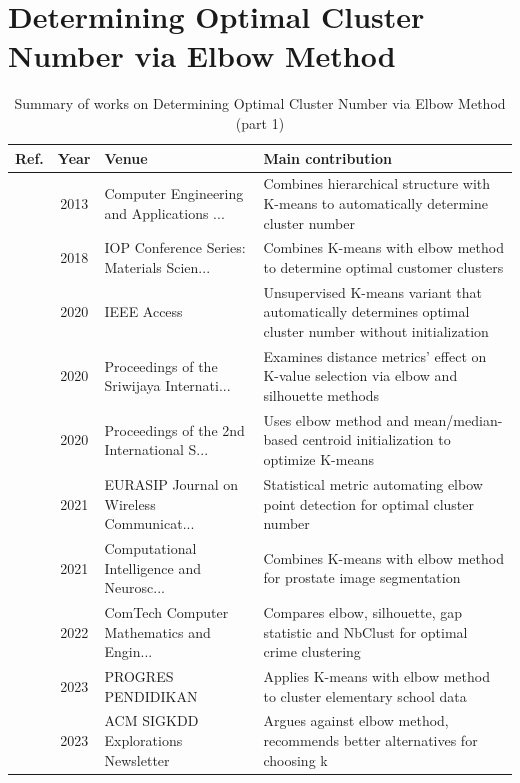 \section{Determining Optimal Cluster Number via Elbow Method}\label{sec:theme1}
\begin{table}[!t]
\centering
\renewcommand{\arraystretch}{1.2}
\caption{Summary of works on Determining Optimal Cluster Number via Elbow Method (part 1)}\label{tab:theme1}
\begin{tabularx}{\textwidth}{@{}l c p{3.6cm} X@{}}
\toprule
\textbf{Ref.} & \textbf{Year} & \textbf{Venue} & \textbf{Main contribution} \\
\midrule
\cite{wei2013improved} & 2013 & Computer Engineering and Applications ... & Combines hierarchical structure with K-means to automatically determine cluster number \\
\cite{syakur2018integration} & 2018 & IOP Conference Series: Materials Scien... & Combines K-means with elbow method to determine optimal customer clusters \\
\cite{sinaga2020unsupervised} & 2020 & IEEE Access & Unsupervised K-means variant that automatically determines optimal cluster number without initialization \\
\cite{saputra2020effect} & 2020 & Proceedings of the Sriwijaya Internati... & Examines distance metrics' effect on K-value selection via elbow and silhouette methods \\
\cite{umargono2020means} & 2020 & Proceedings of the 2nd International S... & Uses elbow method and mean/median-based centroid initialization to optimize K-means \\
\cite{shi2021quantitative} & 2021 & EURASIP Journal on Wireless Communicat... & Statistical metric automating elbow point detection for optimal cluster number \\
\cite{sammouda2021optimized} & 2021 & Computational Intelligence and Neurosc... & Combines K-means with elbow method for prostate image segmentation \\
\cite{sagala2022discovering} & 2022 & ComTech Computer Mathematics and Engin... & Compares elbow, silhouette, gap statistic and NbClust for optimal crime clustering \\
\cite{permadi2023means} & 2023 & PROGRES PENDIDIKAN & Applies K-means with elbow method to cluster elementary school data \\
\cite{schubert2023stop} & 2023 & ACM SIGKDD Explorations Newsletter & Argues against elbow method, recommends better alternatives for choosing k \\

\end{tabularx}
\end{table}
